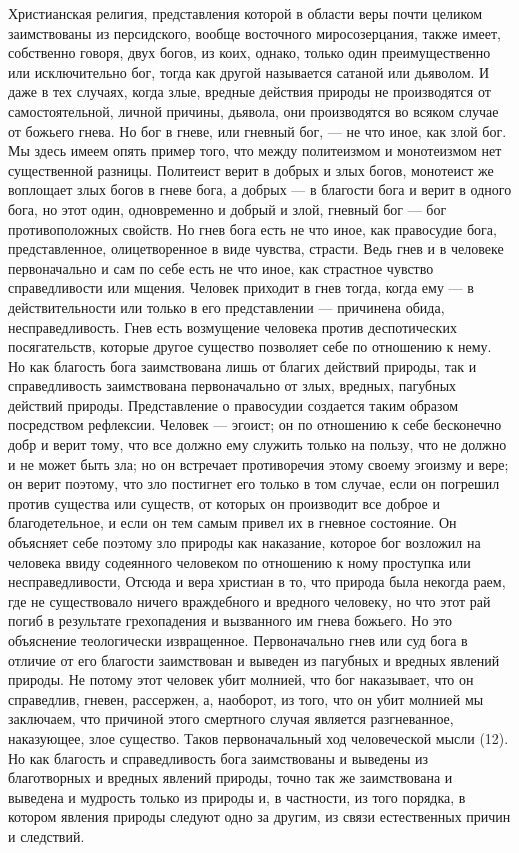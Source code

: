 \documentclass[12pt]{article}
\begin{document}
Христианская религия, представления которой в области веры почти целиком заимствованы из персидского, вообще восточного миросозерцания, также имеет, собственно говоря, двух богов, из коих, однако, только один преимущественно или исключительно бог, тогда как другой называется сатаной или дьяволом. И даже в тех случаях, когда злые, вредные действия природы не производятся от самостоятельной, личной причины, дьявола, они производятся во всяком случае от божьего гнева. Но бог в гневе, или гневный бог, --- не что иное, как злой бог. Мы здесь имеем опять пример того, что между политеизмом и монотеизмом нет существенной разницы. Политеист верит в добрых и злых богов, монотеист же воплощает злых богов в гневе бога, а добрых --- в благости бога и верит в одного бога, но этот один, одновременно и добрый и злой, гневный бог --- бог противоположных свойств. Но гнев бога есть не что иное, как правосудие бога, представленное, олицетворенное в виде чувства, страсти. Ведь гнев и в человеке первоначально и сам по себе есть не что иное, как страстное чувство справедливости или мщения. Человек приходит в гнев тогда, когда ему --- в действительности или только в его представлении --- причинена обида, несправедливость. Гнев есть возмущение человека против деспотических посягательств, которые другое существо позволяет себе по отношению к нему. Но как благость бога заимствована лишь от благих действий природы, так и справедливость заимствована первоначально от злых, вредных, пагубных действий природы. Представление о правосудии создается таким образом посредством рефлексии. Человек --- эгоист; он по отношению к себе бесконечно добр и верит тому, что все должно ему служить только на пользу, что не должно и не может быть зла; но он встречает противоречия этому своему эгоизму и вере; он верит поэтому, что зло постигнет его только в том случае, если он погрешил против существа или существ, от которых он производит все доброе и благодетельное, и если он тем самым привел их в гневное состояние. Он объясняет себе поэтому зло природы как наказание, которое бог возложил на человека ввиду содеянного человеком по отношению к ному проступка или несправедливости, Отсюда и вера христиан в то, что природа была некогда раем, где не существовало ничего враждебного и вредного человеку, но что этот рай погиб в результате грехопадения и вызванного им гнева божьего. Но это объяснение теологически извращенное. Первоначально гнев или суд бога в отличие от его благости заимствован и выведен из пагубных и вредных явлений природы. Не потому этот человек убит молнией, что бог наказывает, что он справедлив, гневен, рассержен, а, наоборот, из того, что он убит молнией мы заключаем, что причиной этого смертного случая является разгневанное, наказующее, злое существо. Таков первоначальный ход человеческой мысли (12). Но как благость и справедливость бога заимствованы и выведены из благотворных и вредных явлений природы, точно так же заимствована и выведена и мудрость только из природы и, в частности, из того порядка, в котором явления природы следуют одно за другим, из связи естественных причин и следствий. 
\end{document}
